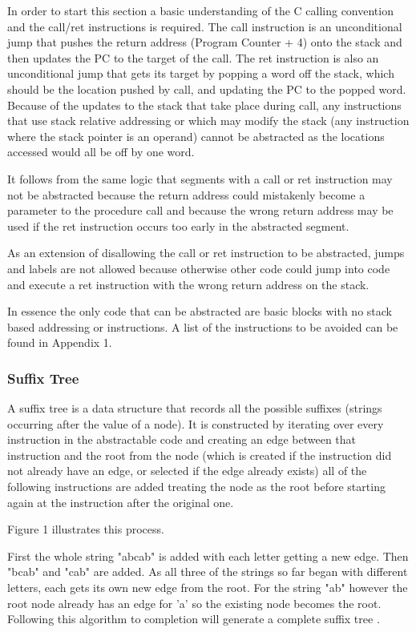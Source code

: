 \documentclass[9pt,nocopyrightspace]{sigplanconf}
\begin{document}
In order to start this section a basic understanding of the C calling convention and the call/ret instructions is required.
The call instruction is an unconditional jump that pushes the return address (Program Counter + 4) onto the stack and then updates the PC to the target of the call.
The ret instruction is also an unconditional jump that gets its target by popping a word off the stack, which should be the location pushed by call, and updating the PC to the popped word.
Because of the updates to the stack that take place during call, any instructions that use stack relative addressing or which may modify the stack (any instruction where the stack pointer is an operand) cannot be abstracted as the locations accessed would all be off by one word.

It follows from the same logic that segments with a call or ret instruction may not be abstracted because the return address could mistakenly become a parameter to the procedure call and because the wrong return address may be used if the ret instruction occurs too early in the abstracted segment.

As an extension of disallowing the call or ret instruction to be abstracted, jumps and labels are not allowed because otherwise other code could jump into code and execute a ret instruction with the wrong return address on the stack.

In essence the only code that can be abstracted are basic blocks with no stack based addressing or instructions.
A list of the instructions to be avoided can be found in Appendix 1.

\subsubsection{Suffix Tree}

A suffix tree is a data structure that records all the possible suffixes (strings occurring after the value of a node).
It is constructed by iterating over every instruction in the abstractable code and creating an edge between that instruction and the root from the node (which is created if the instruction did not already have an edge, or selected if the edge already exists) all of the following instructions are added treating the node as the root before starting again at the instruction after the original one.

Figure 1 illustrates this process.

First the whole string "abcab" is added with each letter getting a new edge.
Then "bcab" and "cab" are added.
As all three of the strings so far began with different letters, each gets its own new edge from the root.
For the string "ab" however the root node already has an edge for 'a' so the existing node becomes the root.
Following this algorithm to completion will generate a complete suffix tree \cite{ctci01}.
\end{document}
